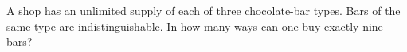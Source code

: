 A shop has an unlimited supply of each of three chocolate-bar types. Bars of the same type are indistinguishable. In how many ways can one buy exactly nine bars?
